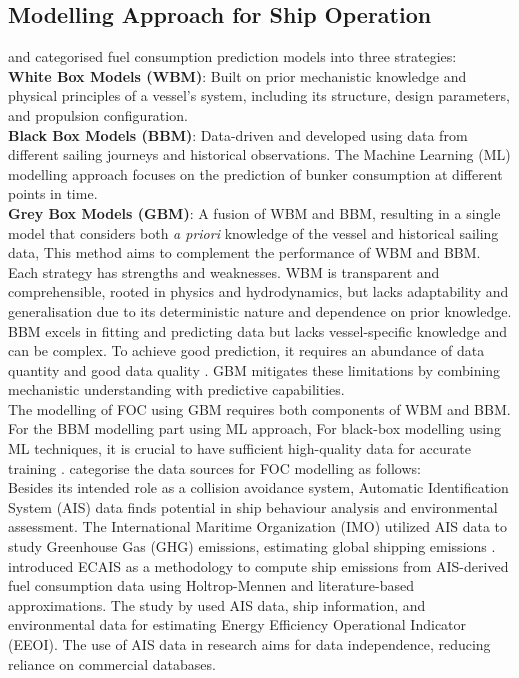 \documentclass[]{interact}
\theoremstyle{plain}%
\theoremstyle{definition}
\theoremstyle{remark}
\begin{document}
\subsection{Modelling Approach for Ship Operation}\label{sec:modelling_type}

\citet{haranen2016white} and \citet{Coraddu.2017} categorised fuel consumption prediction models into three strategies:\\

\textbf{White Box Models (WBM)}: Built on prior mechanistic knowledge and physical principles of a vessel's system, including its structure, design parameters, and propulsion configuration.\\

\textbf{Black Box Models (BBM)}: Data-driven and developed using data from different sailing journeys and historical observations. The Machine Learning (ML) modelling approach focuses on the prediction of bunker consumption at different points in time.\\

\textbf{Grey Box Models (GBM)}: A fusion of WBM and BBM, resulting in a single model that considers both \emph{a priori} knowledge of the vessel and historical sailing data, This method aims to complement the performance of WBM and BBM.\\

Each strategy has strengths and weaknesses. WBM is transparent and comprehensible, rooted in physics and hydrodynamics, but lacks adaptability and generalisation due to its deterministic nature and dependence on prior knowledge. BBM excels in fitting and predicting data but lacks vessel-specific knowledge and can be complex. To achieve good prediction, it requires an abundance of data quantity and good data quality \citep{Halevy.2009}. GBM mitigates these limitations by combining mechanistic understanding with predictive capabilities.\\

The modelling of FOC using GBM requires both components of WBM and BBM. For the BBM modelling part using ML approach, For black-box modelling using ML techniques, it is crucial to have sufficient high-quality data for accurate training \citep{Halevy.2009}. \citet{Yan.2021} categorise the data sources for FOC modelling as follows:
\\

Besides its intended role as a collision avoidance system, Automatic Identification System (AIS) data finds potential in ship behaviour analysis and environmental assessment. The International Maritime Organization (IMO) utilized AIS data to study Greenhouse Gas (GHG) emissions, estimating global shipping emissions \citep{IMO.2020,T.W.P.Smith.2015}. \citet{Rakke.2016} introduced ECAIS as a methodology to compute ship emissions from AIS-derived fuel consumption data using Holtrop-Mennen and literature-based approximations. The study by \citet{Kim.2020b} used AIS data, ship information, and environmental data for estimating Energy Efficiency Operational Indicator (EEOI). The use of AIS data in research aims for data independence, reducing reliance on commercial databases.\\
\end{document}
